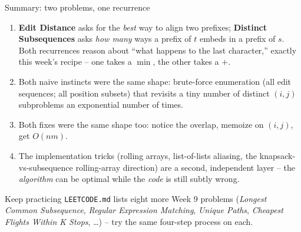 \documentclass[11pt,aspectratio=169]{beamer}
\begin{document}
\begin{frame}{Summary: two problems, one recurrence}
  \footnotesize
  \begin{enumerate}
    \item \textbf{Edit Distance} asks for the \emph{best} way to align two prefixes;
    \textbf{Distinct Subsequences} asks \emph{how many} ways a prefix of $t$ embeds in a
    prefix of $s$. Both recurrences reason about ``what happens to the last character,''
    exactly this week's recipe -- one takes a $\min$, the other takes a $+$.
    \item Both naive instincts were the same shape: brute-force enumeration
    (all edit sequences; all position subsets) that revisits a tiny number of distinct
    $(i,j)$ subproblems an exponential number of times.
    \item Both fixes were the same shape too: notice the overlap, memoize on $(i,j)$,
    get $O(nm)$.
    \item The implementation tricks (rolling arrays, list-of-lists aliasing, the
    knapsack-vs-subsequence rolling-array direction) are a second, independent layer --
    the \emph{algorithm} can be optimal while the \emph{code} is still subtly wrong.
  \end{enumerate}
  \begin{alertblock}{Keep practicing}
    \texttt{LEETCODE.md} lists eight more Week 9 problems (\emph{Longest Common
    Subsequence}, \emph{Regular Expression Matching}, \emph{Unique Paths},
    \emph{Cheapest Flights Within K Stops}, \dots) -- try the same four-step process on
    each.
  \end{alertblock}
\end{frame}
\end{document}
